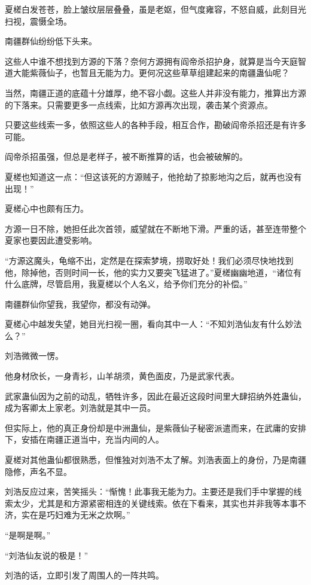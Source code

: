 \begin{this_body}
夏槎白发苍苍，脸上皱纹层层叠叠，虽是老妪，但气度雍容，不怒自威，此刻目光扫视，震慑全场。

南疆群仙纷纷低下头来。

这些人中谁不想找到方源的下落？奈何方源拥有阎帝杀招护身，就算是当今天庭智道大能紫薇仙子，也暂且无能为力。更何况这些草草组建起来的南疆蛊仙呢？

当然，南疆正道的底蕴十分雄厚，绝不容小觑。这些人并非没有能力，推算出方源的下落来。只需要更多一点线索，比如方源再次出现，袭击某个资源点。

只要这些线索一多，依照这些人的各种手段，相互合作，勘破阎帝杀招还是有许多可能。

阎帝杀招虽强，但总是老样子，被不断推算的话，也会被破解的。

夏槎也知道这一点：“但这该死的方源贼子，他抢劫了掠影地沟之后，就再也没有出现！”

夏槎心中也颇有压力。

方源一日不除，她担任此次首领，威望就在不断地下滑。严重的话，甚至连带整个夏家也要因此遭受影响。

“方源这魔头，龟缩不出，定然是在探索梦境，捞取好处！我们必须尽快地找到他，除掉他，否则时间一长，他的实力又要突飞猛进了。”夏槎幽幽地道，“诸位有什么底牌，尽管启用，我夏槎以个人名义，给予你们充分的补偿。”

南疆群仙你望我，我望你，都没有动弹。

夏槎心中越发失望，她目光扫视一圈，看向其中一人：“不知刘浩仙友有什么妙法么？”

刘浩微微一愣。

他身材欣长，一身青衫，山羊胡须，黄色面皮，乃是武家代表。

武家蛊仙因为之前的动乱，牺牲许多，因此在最近这段时间里大肆招纳外姓蛊仙，成为客卿太上家老。刘浩就是其中一员。

但实际上，他的真正身份却是中洲蛊仙，是紫薇仙子秘密派遣而来，在武庸的安排下，安插在南疆正道当中，充当内间的人。

夏槎对其他蛊仙都很熟悉，但惟独对刘浩不太了解。刘浩表面上的身份，乃是南疆隐修，声名不显。

刘浩反应过来，苦笑摇头：“惭愧！此事我无能为力。主要还是我们手中掌握的线索太少，尤其是和方源紧密相连的关键线索。依在下看来，其实也并非我等本事不济，实在是巧妇难为无米之炊啊。”

“是啊是啊。”

“刘浩仙友说的极是！”

刘浩的话，立即引发了周围人的一阵共鸣。


\end{this_body}

